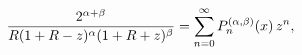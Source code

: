 \[\frac{2^{\alpha+\beta}}{R(1+R-z)^{\alpha}(1+R+z)^{\beta}}=\sum_{n=0}^{\infty}%
\mathop{P^{(\alpha,\beta)}_{n}\/}\nolimits\!\left(x\right)z^{n},\]